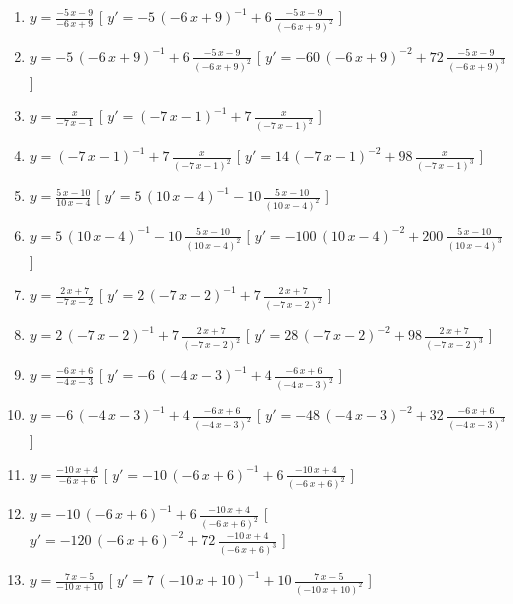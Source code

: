 \begin{esercizio}
\begin{enumerate}
\item $y= {\frac {-5\,x-9}{-6\,x+9}} $ \hfill [ $y'= -5\, \left( -6\,x+9 \right) ^{-1}+6\,{\frac {-5\,x-9}{ \left( -6\,x+9 \right) ^{2}}}$ ]
\item $y= -5\, \left( -6\,x+9 \right) ^{-1}+6\,{\frac {-5\,x-9}{ \left( -6\,x+9 \right) ^{2}}} $ \hfill [ $y'= -60\, \left( -6\,x+9 \right) ^{-2}+72\,{\frac {-5\,x-9}{ \left( -6\,x+9 \right) ^{3}}}$ ]
\item $y= {\frac {x}{-7\,x-1}} $ \hfill [ $y'=  \left( -7\,x-1 \right) ^{-1}+7\,{\frac {x}{ \left( -7\,x-1 \right) ^{2}}}$ ]
\item $y=  \left( -7\,x-1 \right) ^{-1}+7\,{\frac {x}{ \left( -7\,x-1 \right) ^{2}}} $ \hfill [ $y'= 14\, \left( -7\,x-1 \right) ^{-2}+98\,{\frac {x}{ \left( -7\,x-1 \right) ^{3}}}$ ]
\item $y= {\frac {5\,x-10}{10\,x-4}} $ \hfill [ $y'= 5\, \left( 10\,x-4 \right) ^{-1}-10\,{\frac {5\,x-10}{ \left( 10\,x-4 \right) ^{2}}}$ ]
\item $y= 5\, \left( 10\,x-4 \right) ^{-1}-10\,{\frac {5\,x-10}{ \left( 10\,x-4 \right) ^{2}}} $ \hfill [ $y'= -100\, \left( 10\,x-4 \right) ^{-2}+200\,{\frac {5\,x-10}{ \left( 10\,x-4 \right) ^{3}}}$ ]
\item $y= {\frac {2\,x+7}{-7\,x-2}} $ \hfill [ $y'= 2\, \left( -7\,x-2 \right) ^{-1}+7\,{\frac {2\,x+7}{ \left( -7\,x-2 \right) ^{2}}}$ ]
\item $y= 2\, \left( -7\,x-2 \right) ^{-1}+7\,{\frac {2\,x+7}{ \left( -7\,x-2 \right) ^{2}}} $ \hfill [ $y'= 28\, \left( -7\,x-2 \right) ^{-2}+98\,{\frac {2\,x+7}{ \left( -7\,x-2 \right) ^{3}}}$ ]
\item $y= {\frac {-6\,x+6}{-4\,x-3}} $ \hfill [ $y'= -6\, \left( -4\,x-3 \right) ^{-1}+4\,{\frac {-6\,x+6}{ \left( -4\,x-3 \right) ^{2}}}$ ]
\item $y= -6\, \left( -4\,x-3 \right) ^{-1}+4\,{\frac {-6\,x+6}{ \left( -4\,x-3 \right) ^{2}}} $ \hfill [ $y'= -48\, \left( -4\,x-3 \right) ^{-2}+32\,{\frac {-6\,x+6}{ \left( -4\,x-3 \right) ^{3}}}$ ]
\item $y= {\frac {-10\,x+4}{-6\,x+6}} $ \hfill [ $y'= -10\, \left( -6\,x+6 \right) ^{-1}+6\,{\frac {-10\,x+4}{ \left( -6\,x+6 \right) ^{2}}}$ ]
\item $y= -10\, \left( -6\,x+6 \right) ^{-1}+6\,{\frac {-10\,x+4}{ \left( -6\,x+6 \right) ^{2}}} $ \hfill [ $y'= -120\, \left( -6\,x+6 \right) ^{-2}+72\,{\frac {-10\,x+4}{ \left( -6\,x+6 \right) ^{3}}}$ ]
\item $y= {\frac {7\,x-5}{-10\,x+10}} $ \hfill [ $y'= 7\, \left( -10\,x+10 \right) ^{-1}+10\,{\frac {7\,x-5}{ \left( -10\,x+10 \right) ^{2}}}$ ]

\end{enumerate}
\end{esercizio}
